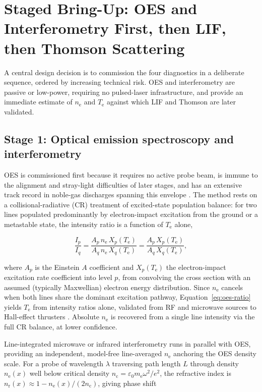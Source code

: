 \section{Staged Bring-Up: OES and Interferometry First, then LIF, then Thomson Scattering}
\label{sec:staged-bringup}

A central design decision is to commission the four diagnostics in a deliberate sequence, ordered by increasing technical risk. OES and interferometry are passive or low-power, requiring no pulsed-laser infrastructure, and provide an immediate estimate of $n_{\mathrm{e}}$ and $T_{\mathrm{e}}$ against which LIF and Thomson are later validated.

\subsection{Stage 1: Optical emission spectroscopy and interferometry}

OES is commissioned first because it requires no active probe beam, is immune to the alignment and stray-light difficulties of later stages, and has an extensive track record in noble-gas discharges spanning this envelope \cite{ref0231,ref0237}. The method rests on a collisional-radiative (CR) treatment of excited-state population balance: for two lines populated predominantly by electron-impact excitation from the ground or a metastable state, the intensity ratio is a function of $T_{\mathrm{e}}$ alone,

\begin{equation}
\frac{I_{p}}{I_{q}} = \frac{A_{p} \, n_{\mathrm{e}} \, X_{p}(T_{\mathrm{e}})}{A_{q} \, n_{\mathrm{e}} \, X_{q}(T_{\mathrm{e}})} = \frac{A_{p}\,X_{p}(T_{\mathrm{e}})}{A_{q}\,X_{q}(T_{\mathrm{e}})},
\label{eq:oes-ratio}
\end{equation}

where $A_{p}$ is the Einstein $A$ coefficient and $X_{p}(T_{\mathrm{e}})$ the electron-impact excitation rate coefficient into level $p$, from convolving the cross section with an assumed (typically Maxwellian) electron energy distribution. Since $n_{\mathrm{e}}$ cancels when both lines share the dominant excitation pathway, Equation~\eqref{eq:oes-ratio} yields $T_{\mathrm{e}}$ from intensity ratios alone, validated from RF and microwave sources to Hall-effect thrusters \cite{ref0245,ref0256}. Absolute $n_{\mathrm{e}}$ is recovered from a single line intensity via the full CR balance, at lower confidence.

Line-integrated microwave or infrared interferometry runs in parallel with OES, providing an independent, model-free line-averaged $n_{\mathrm{e}}$ anchoring the OES density scale. For a probe of wavelength $\lambda$ traversing path length $L$ through density $n_{\mathrm{e}}(x)$ well below critical density $n_{\mathrm{c}} = \varepsilon_{0} m_{\mathrm{e}} \omega^{2}/e^{2}$, the refractive index is $n_{\mathrm{r}}(x) \approx 1 - n_{\mathrm{e}}(x)/(2 n_{\mathrm{c}})$, giving phase shift

